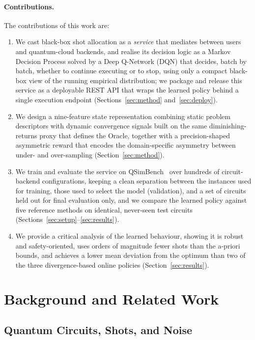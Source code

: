 \documentclass[runningheads]{llncs}
\begin{document}
\paragraph{Contributions.} The contributions of this work are:
\begin{enumerate}
  \item We cast black-box shot allocation as a \emph{service} that mediates
  between users and quantum-cloud backends, and realise its decision logic as a
  Markov Decision Process solved by a Deep Q-Network (DQN) that decides, batch by
  batch, whether to continue executing or to stop, using only a compact black-box
  view of the running empirical distribution; we package and release this service
  as a deployable REST API that wraps the learned policy behind a single execution
  endpoint (Sections~\ref{sec:method} and~\ref{sec:deploy}).
  \item We design a nine-feature state representation combining static problem
  descriptors with dynamic convergence signals built on the same
  diminishing-returns proxy that defines the Oracle, together
  with a precision-shaped asymmetric reward that encodes the domain-specific
  asymmetry between under- and over-sampling (Section~\ref{sec:method}).
  \item We train and evaluate the service on QSimBench~\cite{qsimbench} over
  hundreds of circuit-backend configurations, keeping a clean separation
  between the instances used for training, those used to select the model
  (validation), and a set of circuits held out for final evaluation only, and
  we compare the learned policy against five reference methods on identical,
  never-seen test circuits (Sections~\ref{sec:setup}--\ref{sec:results}).
  \item We provide a critical analysis of the learned behaviour, showing it is
  robust and safety-oriented, uses orders of magnitude fewer shots than the
  a-priori bounds, and achieves a lower mean deviation from the optimum than
  two of the three divergence-based online policies
  (Section~\ref{sec:results}).
\end{enumerate}

\section{Background and Related Work}
\label{sec:background}

\subsection{Quantum Circuits, Shots, and Noise}
\label{sec:qbackground}
\end{document}
